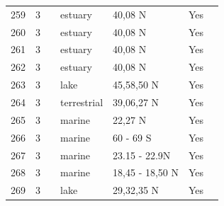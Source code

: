 \documentclass[12pt]{article}
\begin{document}
\begin{landscape}
\begin{table}[h!]
{\begin{tabular}{p{2.8cm}p{1.3cm}p{5.5cm}p{2.2cm}p{2.5cm}lp{3.5cm}}
        259   & 3 & \citet{Baeta2011}  & estuary & 40,08 N & Yes   &       \\
        260   & 3 & \citet{Baeta2011}  & estuary & 40,08 N & Yes   &       \\
        261   & 3 & \citet{Baeta2011}  & estuary & 40,08 N & Yes   &       \\
        262   & 3 & \citet{Baeta2011}  & estuary & 40,08 N & Yes   &       \\
        263   & 3 & \citet{Schneider1997}    & lake  & 45,58,50 N & Yes   &       \\
        264   & 3 & \citet{Stagliano2002}    & terrestrial & 39,06,27 N & Yes   &       \\
        265   & 3 & \citet{Lin2006}  & marine & 22,27 N & Yes   &       \\
        266   & 3 & \citet{Cornejo-Donoso2008}  & marine & 60 - 69 S & Yes   &       \\
        267   & 3 & \citet{Zetina-Rejon2003}  & marine & 23.15 - 22.9N & Yes   &       \\
        268   & 3 & \citet{Cruz-Escalona2007}  & marine & 18,45 - 18,50 N & Yes   &       \\
        269   & 3 & \citet{Liu2007}  & lake  & 29,32,35 N & Yes   &       \\
         \hline
      \end{tabular}}%
      \end{table}

        \newpage


\end{landscape}
\end{document}
